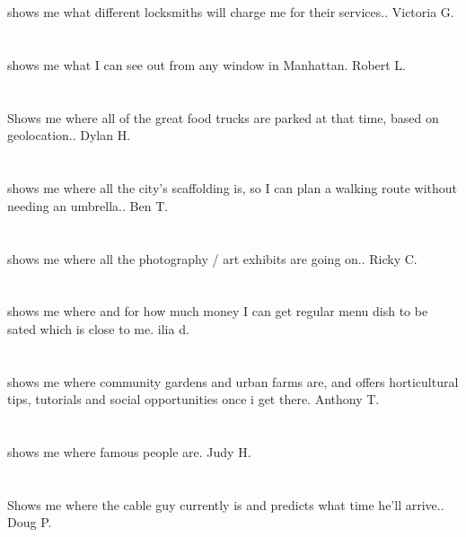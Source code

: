\section{}shows me what different locksmiths will charge me for their services.. Victoria G.
\section{} shows me what I can see out from any window in Manhattan. Robert L.
\section{}Shows me where all of the great food trucks are parked at that time,  based on geolocation.. Dylan H.
\section{}shows me where all the city's scaffolding is,  so I can plan a walking route without needing an umbrella.. Ben T.
\section{}shows me where all the photography / art exhibits are going on.. Ricky C.
\section{}shows me where and for how much money I can get regular menu dish to be sated which is close to me. ilia d.
\section{}shows me where community gardens and urban farms are,  and offers horticultural tips,  tutorials and social opportunities once i get there. Anthony T.
\section{}shows me where famous people are. Judy H.
\section{}Shows me where the cable guy currently is and predicts what time he'll arrive.. Doug P.
